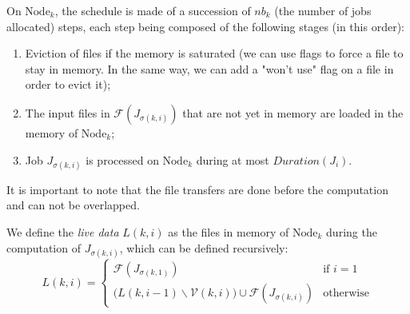 \documentclass[a4paper]{article}
\newcommand{\Node}[1]{\ensuremath{\mathrm{Node}_{#1}}\xspace}
\newcommand{\inputs}{\ensuremath{\mathcal{F}}\xspace}
\newcommand{\memory}{\ensuremath{\mathcal{M}}\xspace}
\newcommand{\duration}{\mathit{Duration}\xspace}
\newcommand{\jobset}{\ensuremath{\mathbb{J}}\xspace}
\newcommand{\evict}{\ensuremath{\mathcal{V}}\xspace}
\newcommand{\nbloads}{\ensuremath{\mathit{\mathit{Loads}}}\xspace}
\newcommand{\live}{\ensuremath{L}\xspace}
\begin{document}
On $\Node{k}$, the schedule is made of a
succession of $\mathit{nb}_k$ (the number of jobs allocated) steps, each step being composed of the
following stages (in this order):
\begin{enumerate}
\item Eviction of files if the memory is saturated (we can use flags to force a file to stay in memory. In the same way, we can add a "won't use" flag on a file in order to evict it);
\item The input files in $\inputs(J_{\sigma(k,i)})$ that are not yet in memory are loaded in the memory of $\Node{k}$;
\item Job $J_{\sigma(k,i)}$ is processed on $\Node{k}$ during at most $\duration(J_i)$.
\end{enumerate}
It is important to note that the file transfers are done before the computation and can not be overlapped.

We define the \emph{live data} $\live(k,i)$
as the files in memory of $\Node{k}$ during the computation of $J_{\sigma(k,i)}$, which
can be defined recursively:
$$
\live(k,i)=
\begin{cases}
  \inputs(J_{\sigma(k,1)}) & \text{if~}i=1\\
\Big(\live(k,i-1) \backslash \evict(k,i)\Big) \cup \inputs(J_{\sigma(k,i)})
& \text{otherwise}
\end{cases}
$$


\end{document}
